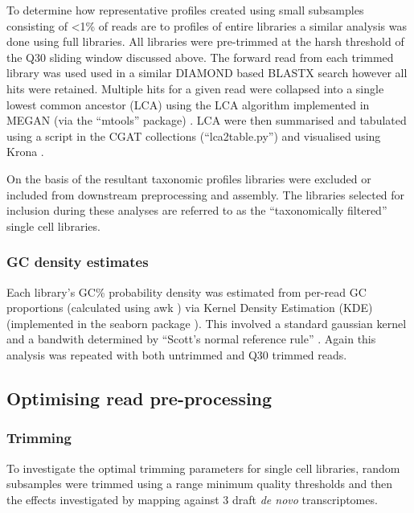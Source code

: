 To determine how representative profiles created using small subsamples 
consisting of <1\% of reads are to profiles of entire libraries a similar analysis
was done using full libraries. All libraries were pre-trimmed at the harsh
threshold of the Q30 sliding window discussed above. 
The forward read from each trimmed library was used 
used in a similar DIAMOND based BLASTX search however all hits were retained.
Multiple hits for a given read were collapsed 
into a single lowest common ancestor (LCA) using the LCA algorithm \citep{Gabow1985} implemented in MEGAN (via the ``mtools''
package) \citep{Huson2007,el2013improved}.  LCA were then summarised and tabulated using
a script in the CGAT collections (``lca2table.py'') \citep{Sims2014} and visualised 
using Krona \citep{Ondov2011}.

On the basis of the resultant taxonomic profiles libraries were excluded or included
from downstream preprocessing and assembly. The libraries selected for inclusion during these analyses 
are referred to as the ``taxonomically filtered'' single cell libraries.

\subsubsection{GC density estimates}

Each library's GC\% probability density was estimated from per-read GC proportions
(calculated using awk \citep{Aho1987}) via Kernel Density Estimation (KDE) \citep{Rosenblatt1956,Parzen1962} 
(implemented in the seaborn package \citep{michael_waskom_2015_19108}).
This involved a standard gaussian kernel and a bandwith determined by ``Scott's normal reference rule'' \citep{Scott1979}.  
Again this analysis was repeated with both untrimmed and Q30 trimmed reads. 

\subsection{Optimising read pre-processing}

\subsubsection{Trimming}

To investigate the optimal trimming parameters for single cell libraries, 
random subsamples were trimmed using a range minimum quality thresholds and then the effects investigated
by mapping against 3 draft \textit{de novo} transcriptomes.

